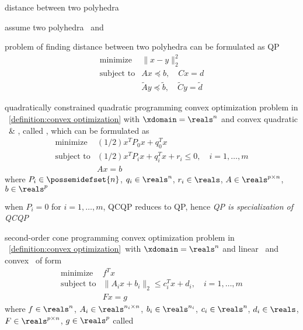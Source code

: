 \documentclass[17pt,landscape]{foils}
\begin{document}
{\item distance between two polyhedra
	\bit
	\item
		assume two polyhedra
		\
		and
		\
	\item
		problem of finding distance between two polyhedra
		can be formulated as QP
		$$
			\begin{array}{ll}
				\mbox{minimize} &
					\|x-y\|_2^2
				\\
				\mbox{subject to} &
					Ax\preceq b, \quad Cx =d
				\\ &
					\tilde{A}y\preceq \tilde{b}, \quad \tilde{C}y =\tilde{d}
			\end{array}
		$$
	\eit
\eit



\begin{mydefinition}{quadratically constrained quadratic programming}
	convex optimization problem in ~\ref{definition:convex optimization}
	with $\xdomain=\reals^n$
	and
	convex quadratic \fobj\ \& \fie,
	called ,
	which can be formulated as
	$$
		\begin{array}{ll}
			\mbox{minimize}
				& (1/2) x^TP_0x + q_0^Tx
			\\
			\mbox{subject to}
				& (1/2) x^TP_ix + q_i^Tx + r_i \leq0,\quad i=1,\ldots,m
			\\
				& A x =b
		\end{array}
	$$
	where
		$P_i\in\possemidefset{n}$, $q_i\in\reals^n$, $r_i\in\reals$,
		$A\in\reals^{p\times n}$, $b\in\reals^p$
\end{mydefinition}

\bit
\item
	when $P_i=0$ for $i=1,\ldots,m$, QCQP reduces to QP,
	hence \emph{QP is specialization of QCQP}
\eit



\begin{mydefinition}{second-order cone programming}
	convex optimization problem in ~\ref{definition:convex optimization}\
	with $\xdomain=\reals^n$
	and
	linear \fobj\ and convex \fie\
	of form
	$$
		\begin{array}{ll}
			\mbox{minimize}
				& f^T x
			\\
			\mbox{subject to}
				& \|A_ix + b_i\|_2 \leq c_i^T x + d_i,\quad i=1,\ldots,m
			\\
				& F x =g
		\end{array}
	$$
	where
		$f\in\reals^n$,
		$A_i\in\reals^{n_i\times n}$, $b_i\in\reals^{n_i}$,
		$c_i\in\reals^{n}$, $d_i\in\reals$,
		$F\in\reals^{p\times n}$, $g\in\reals^p$
	called 
\end{mydefinition}

}
\end{document}

